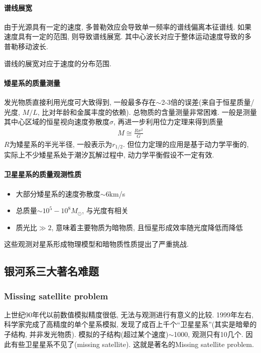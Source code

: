 \paragraph{谱线展宽}
由于光源具有一定的速度, 多普勒效应会导致单一频率的谱线偏离本征谱线. 如果速度具有一定的范围, 则导致谱线展宽. 其中心波长对应于整体运动速度导致的多普勒移动波长. 

谱线的展宽对应于速度的分布范围. 

\paragraph{矮星系的质量测量}
发光物质直接利用光度可大致得到, 一般最多存在$\sim$2-3倍的误差(来自于恒星质量/光度, $M/L$, 比对年龄和金属丰度的依赖). 总物质的含量测量非常困难. 一般是测量其中心区域的恒星视向速度弥散度$\sigma$, 再进一步利用位力定理来得到质量
\begin{align*}
    M \cong \frac{R\sigma^2}{G}
\end{align*}
$R$为矮星系的半光半径, 一般表示为$r_{1/2}$. 但位力定理的应用是基于动力学平衡的, 实际上不少矮星系处于潮汐瓦解过程中, 动力学平衡假设不一定有效. 

\paragraph{卫星星系的质量观测性质} 
\begin{itemize}\small 
    \item 大部分矮星系的速度弥散度$\sim $6km/s
    \item 总质量$\sim 10^5-10^8M_{\odot}$, 与光度有相关
    \item 质光比$\gg 2$, 意味着主要物质为暗物质, 且恒星形成效率随光度降低而降低
\end{itemize}
这些观测对星系形成物理模型和暗物质性质提出了严重挑战. 

\subsection{银河系三大著名难题}

\subsubsection{Missing satellite problem}
上世纪90年代以前数值模拟精度很低, 无法与观测进行有意义的比较. 1999年左右, 科学家完成了高精度的单个星系模拟, 发现了成百上千个“卫星星系”(其实是暗晕的子结构, 并非发光物质). 模拟的子结构(超过某个速度)$\sim$1000, 观测只有10几个. 因此有些卫星星系不见了(missing satellite). 这就是著名的Missing satellite problem. 


